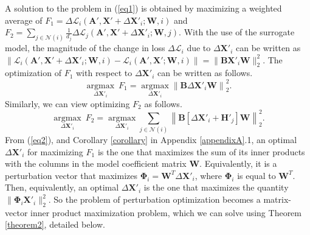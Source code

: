 \documentclass[conference,compsoc]{IEEEtran}
\begin{document}
\par A solution to the problem in (\ref{eq1}) is obtained by maximizing a weighted average of $F_1= \Delta \mathcal{L}_i\left(\boldsymbol{A'}, \boldsymbol{X'}+\Delta \boldsymbol{X'}_i ; \boldsymbol{W}, i\right)$ and $F_2= \sum_{j \in \mathcal{N}(i)} \frac{1}{d_j} \Delta \mathcal{L}_j\left(\boldsymbol{A'}, \boldsymbol{X'}+\Delta \boldsymbol{X'}_i; \boldsymbol{W}, j\right)$. With the use of the surrogate model, the magnitude of the change in loss $\Delta \mathcal{L}_i$ due to $\Delta \boldsymbol{X'}_i$ can be written as $ \|\mathcal{L}_i(\boldsymbol{A'}, \boldsymbol{X'}+\Delta \boldsymbol{X'}_i; \boldsymbol{W},i)- \mathcal{L}_i(\boldsymbol{A'}, \boldsymbol{X'}; \boldsymbol{W},i)\|=\|\boldsymbol{B} \boldsymbol{X'}_i \boldsymbol{W}\|_2^2$. The optimization of $F_1$ with respect to $\Delta \boldsymbol{X'}_i$ can be written as follows.
\begin{equation}\label{eq2}
\underset{\Delta \boldsymbol{X'}_i}{\operatorname{argmax}} ~F_1=\underset{\Delta \boldsymbol{X'}_i}{\operatorname{argmax}}\left\|\boldsymbol{B} \Delta \boldsymbol{X'}_i \boldsymbol{W}\right\|_2^2.
\end{equation} 
\noindent Similarly, we can view optimizing $F_2$ as follows.
\begin{equation}\label{eq3}
\underset{\Delta \boldsymbol{X'}_i}{\operatorname{argmax}} ~F_2=\underset{\Delta \boldsymbol{X'}_i}{\operatorname{argmax}}\sum_{j\in \mathcal{N}(i)} \left\|\boldsymbol{B}\left[\Delta \boldsymbol{X'}_i+\boldsymbol{H'}_j\right] \boldsymbol{W}\right\|_2^2.
\end{equation}
\noindent From (\ref{eq2}), and Corollary \ref{corollary} in Appendix \ref{appendixA}.1, an optimal $\Delta \boldsymbol{X'}_i$ for maximizing $F_1$ is the one that maximizes the sum of its inner products with the columns in the model coefficient matrix $\boldsymbol{W}$. Equivalently, it is a perturbation vector that maximizes $\boldsymbol{\Phi}_i=\boldsymbol{W}^T \Delta \boldsymbol{X'}_i$, where $\boldsymbol{\Phi}_i$ is equal to $\boldsymbol{W}^T$. Then, equivalently, an optimal $\Delta \boldsymbol{X'}_i$ is the one that maximizes the quantity $\|\boldsymbol{\Phi}_i \boldsymbol{X'}_i\|_2^2$. So the problem of perturbation optimization becomes a matrix-vector inner product maximization problem, which we can solve using Theorem \ref{theorem2}, detailed below.
\end{document}
